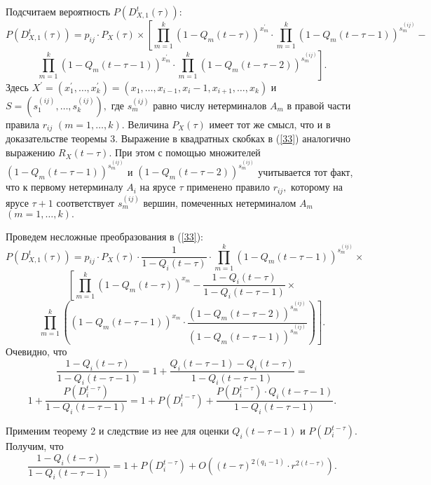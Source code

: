 \documentclass[%
11pt,a4paper]{article}
\begin{document}
{{{Подсчитаем вероятность $P\left(D_{X,1}^t(\tau)\right):$
$$
P\left(D_{X,1}^t(\tau)\right)=p_{ij} \cdot
P_X(\tau) \times
\left[\prod_{m=1}^k \left(1-Q_m(t-\tau)\right)^{x_m^{\prime}}\cdot
\prod_{m=1}^k \left(1-Q_m(t-\tau-1)\right)^{s_m^{(ij)}}- \right.
$$
\begin{equation}
\left. \prod_{m=1}^k \left(1-Q_m(t-\tau-1)\right)^{x_m^{\prime}}\cdot
\prod_{m=1}^k \left(1-Q_m(t-\tau-2)\right)^{s_m^{(ij)}}\right].
\label{33}
\end{equation}
Здесь $X^{\prime}=(x_1^{\prime},\ldots,x_k^{\prime})=
(x_1,\ldots,x_{i-1},x_i-1,x_{i+1},\ldots, x_k)$ и
$S=(s_1^{(ij)}, \ldots, s_k^{(ij)}),$ где $s_m^{(ij)}$ равно
числу нетерминалов $A_m$ в правой части правила $r_{ij}$ $(m=1,\ldots, k).$
Величина $P_X(\tau)$ имеет тот же смысл, что и в доказательстве теоремы 3.
Выражение в квадратных скобках в (\ref{33})
аналогично выражению $R_X(t-\tau).$  При этом
с помощью множителей $\left(1-Q_m(t-\tau-1)\right)^{s_m^{(ij)}}$ и
$\left(1-Q_m(t-\tau-2)\right)^{s_m^{(ij)}}$
учитывается тот факт, что к первому нетерминалу $A_i$ на ярусе $\tau$
применено правило $r_{ij},$ которому на ярусе $\tau+1$ соответствует
$s_m^{(ij)}$ вершин, помеченных нетерминалом $A_m$ $(m=1, \ldots, k).$

Проведем несложные преобразования в (\ref{33}):
$$
P\left(D_{X,1}^t(\tau)\right)=p_{ij} \cdot P_X(\tau) \cdot
\frac{1}{1-Q_i(t-\tau)}\cdot \prod_{m=1}^k \left(1-Q_m(t-\tau-1)\right)
^{s_m^{(ij)}}\times
$$
$$
\left[\prod_{m=1}^k \left(1-Q_m(t-\tau)\right)^{x_m}-
\frac{1-Q_i(t-\tau)}{1-Q_i(t-\tau-1)}\times \right.
$$
$$
\left. \prod_{m=1}^k \left(\left(1-Q_m(t-\tau-1)\right)^{x_m} \cdot
\frac{\left(1-Q_m(t-\tau-2)\right)^{s_m^{(ij)}}}
{\left(1-Q_m(t-\tau-1)\right)^{s_m^{(ij)}}}\right)\right].
$$
Очевидно, что
$$
\frac{1-Q_i(t-\tau)}{1-Q_i(t-\tau-1)}=
1+\frac{Q_i(t-\tau-1)-Q_i(t-\tau)}{1-Q_i(t-\tau-1)}=
$$
$$
1+\frac{P(D_i^{t-\tau})}{1-Q_i(t-\tau-1)}=
1+P(D_i^{t-\tau})+\frac{P(D_i^{t-\tau})\cdot Q_i(t-\tau-1) }{1-Q_i(t-\tau-1)}.
$$

Применим теорему 2 и следствие из нее для оценки $Q_i(t-\tau-1)$ и $P(D_i^{t-\tau})$.
Получим, что
$$
\frac{1-Q_i(t-\tau)}{1-Q_i(t-\tau-1)}= 1+P(D_i^{t-\tau})+O((t-\tau)^{2(q_1-1)}\cdot r^{2(t-\tau)}).
$$

}}}
\end{document}
